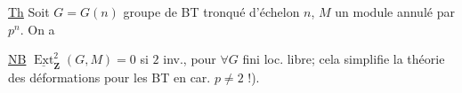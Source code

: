 \uline{Th} Soit $G=G(n)$ groupe de BT tronqué d'échelon $n$, $M$ un module  annulé par $p^n$.
On a

\uline{NB} $\underline{\operatorname{Ext}}^2_{\mathbf Z}(G,M)=0$ si $2$ inv., pour $\forall G$ fini loc. libre; cela simplifie la théorie des déformations pour les BT en car. $p\ne2$ !).
